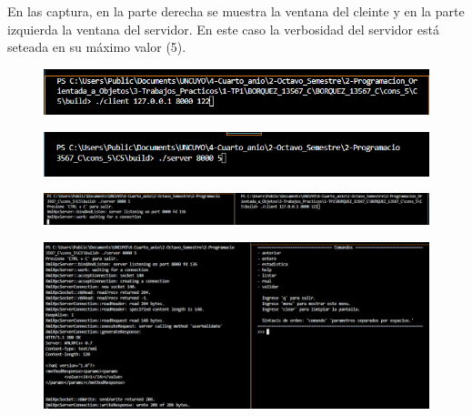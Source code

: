 \documentclass[a4paper,12pt]{article}
\begin{document}
En las captura, en la parte derecha se muestra la ventana del cleinte y en
la parte izquierda la ventana del servidor. En este caso la verbosidad del servidor
está seteada en su máximo valor (5).
\begin{figure}[htbp]
    \centering
    \begin{adjustbox}{max width=\textwidth, center}
        \includegraphics{C5/Linea_ejecucion_cliente.PNG}
    \end{adjustbox}
\end{figure}
\begin{figure}[htbp]
    \centering
    \begin{adjustbox}{max width=\textwidth, center}
        \includegraphics{C5/Linea_ejecucion_servidor.PNG}
    \end{adjustbox}
\end{figure}
\begin{figure}[htbp]
    \centering
    \begin{adjustbox}{max width=\textwidth, center}
        \includegraphics{C5/Servidor_cliente_1.PNG}
    \end{adjustbox}
\end{figure}
\begin{figure}[htbp]
    \centering
    \begin{adjustbox}{max width=\textwidth, center}
        \includegraphics{C5/Servidor_cliente_2.PNG}
    \end{adjustbox}
\end{figure}
\end{document}

